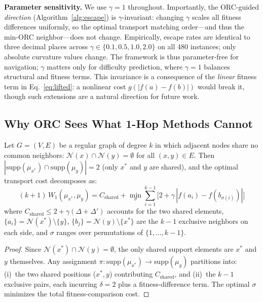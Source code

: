 \documentclass[runningheads]{llncs}
\begin{document}
\textbf{Parameter sensitivity.}
We use $\gamma\!=\!1$ throughout.
Importantly, the ORC-guided \emph{direction} (Algorithm~\ref{alg:escape}) is $\gamma$-invariant: changing $\gamma$ scales all fitness differences uniformly, so the optimal transport matching order---and thus the min-ORC neighbor---does not change.
Empirically, escape rates are identical to three decimal places across $\gamma \in \{0.1, 0.5, 1.0, 2.0\}$ on all 480 instances; only absolute curvature values change.
The framework is thus parameter-free for navigation; $\gamma$ matters only for difficulty prediction, where $\gamma\!=\!1$ balances structural and fitness terms.
This invariance is a consequence of the \emph{linear} fitness term in Eq.~\eqref{eq:lifted}: a nonlinear cost $g(|f(a)-f(b)|)$ would break it, though such extensions are a natural direction for future work.

\subsection{Why ORC Sees What 1-Hop Methods Cannot}

\begin{proposition}
\label{prop:decomposition}
Let $G = (V,E)$ be a regular graph of degree $k$ in which adjacent nodes share no common neighbors: $\mathcal{N}(x) \cap \mathcal{N}(y) = \emptyset$ for all $(x,y) \in E$.
Then $|\mathrm{supp}(\mu_{x^*}) \cap \mathrm{supp}(\mu_y)| = 2$ (only $x^*$ and $y$ are shared), and the optimal transport cost decomposes as:
\begin{equation}
(k\!+\!1)\,W_1(\mu_{x^*}, \mu_y) = C_{\mathrm{shared}} + \min_{\sigma} \sum_{i=1}^{k-1} \bigl[2 + \gamma\,|f(a_i) - f(b_{\sigma(i)})|\bigr]
\end{equation}
where $C_{\mathrm{shared}} \le 2 + \gamma(\Delta + \Delta')$ accounts for the two shared elements, $\{a_i\} = \mathcal{N}(x^*) \setminus \{y\}$, $\{b_j\} = \mathcal{N}(y) \setminus \{x^*\}$ are the $k\!-\!1$ exclusive neighbors on each side, and $\sigma$ ranges over permutations of $\{1,\ldots,k\!-\!1\}$.
\end{proposition}

\begin{proof}
Since $\mathcal{N}(x^*) \cap \mathcal{N}(y) = \emptyset$, the only shared support elements are $x^*$ and $y$ themselves.
Any assignment $\pi: \mathrm{supp}(\mu_{x^*}) \to \mathrm{supp}(\mu_y)$ partitions into: (i)~the two shared positions ($x^*, y$) contributing $C_{\mathrm{shared}}$, and (ii)~the $k\!-\!1$ exclusive pairs, each incurring $\delta = 2$ plus a fitness-difference term.
The optimal $\sigma$ minimizes the total fitness-comparison cost.
\end{proof}
\end{document}
